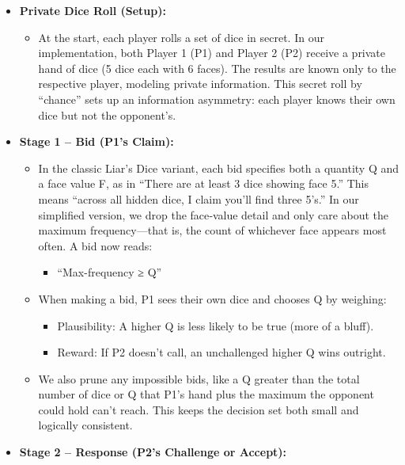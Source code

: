 \documentclass[
]{article}
\begin{document}
\begin{itemize}
\item
  \textbf{Private Dice Roll (Setup):}

  \begin{itemize}
  \item
    At the start, each player rolls a set of dice in secret. In our
    implementation, both Player 1 (P1) and Player 2 (P2) receive a
    private hand of dice (5 dice each with 6 faces). The results are
    known only to the respective player, modeling private information.
    This secret roll by ``chance'' sets up an information asymmetry:
    each player knows their own dice but not the opponent's.
  \end{itemize}
\item
  \textbf{Stage 1 -- Bid (P1's Claim):}

  \begin{itemize}
  \item
    In the classic Liar's Dice variant, each bid specifies both a
    quantity Q and a face value F, as in ``There are at least 3 dice
    showing face 5.'' This means ``across all hidden dice, I claim
    you'll find three 5's.'' In our simplified version, we drop the
    face‐value detail and only care about the maximum frequency---that
    is, the count of whichever face appears most often. A bid now reads:

    \begin{itemize}
    \item
      ``Max-frequency ≥ Q''
    \end{itemize}
  \item
    When making a bid, P1 sees their own dice and chooses Q by weighing:

    \begin{itemize}
    \item
      Plausibility: A higher Q is less likely to be true (more of a
      bluff).
    \item
      Reward: If P2 doesn't call, an unchallenged higher Q wins
      outright.
    \end{itemize}
  \item
    We also prune any impossible bids, like a Q greater than the total
    number of dice or Q that P1's hand plus the maximum the opponent
    could hold can't reach. This keeps the decision set both small and
    logically consistent.
  \end{itemize}
\item
  \textbf{Stage 2 -- Response (P2's Challenge or Accept):}


\end{itemize}
\end{document}
